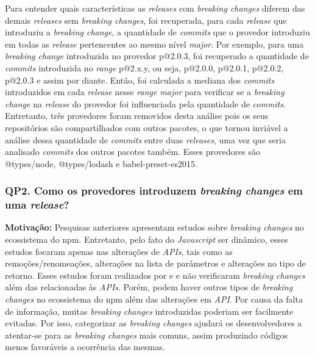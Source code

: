 Para entender quais características as \textit{releases} com \textit{breaking changes} diferem das demais \textit{releases} sem \textit{breaking changes}, foi recuperada, para cada \textit{release} que introduziu a \textit{breaking change}, a quantidade de \textit{commits} que o provedor introduziu em todas as \textit{release} pertencentes ao mesmo nível \textit{major}. Por exemplo, para uma \textit{breaking change} introduzida no provedor \textsf{p@2.0.3}, foi recuperado a quantidade de \textit{commits} introduzida no \textit{range}  \textsf{p@2.x.y}, ou seja, \textsf{p@2.0.0}, \textsf{p@2.0.1}, \textsf{p@2.0.2}, \textsf{p@2.0.3} e assim por diante. Então, foi calculada a mediana dos \textit{commits} introduzidos em cada \textit{release} nesse \textit{range major} para verificar se a \textit{breaking change} na \textit{release} do provedor foi influenciada pela quantidade de \textit{commits}. Entretanto, três provedores foram removidos desta análise pois os seus repositórios são compartilhados com outros pacotes, o que tornou inviável a análise dessa quantidade de \textit{commits} entre duas \textit{releases}, uma vez que seria analisado \textit{commits} dos outros pacotes também. Esses provedores são \textsf{@types/node}, \textsf{@types/lodash} e \textsf{babel-preset-es2015}.


\subsubsection{\large QP2. Como os provedores introduzem \textit{breaking changes} em uma \textit{release}?}
\label{sec:qp2}

\textbf{Motivação:}
Pesquisas anteriores apresentam estudos sobre \textit{breaking changes} no ecossistema do \textsf{npm}. Entretanto, pelo fato do \textit{Javascript} ser dinâmico, esses estudos focaram apenas nas alterações de \textit{APIs}, tais como as remoções/renomeações, alterações na lista de parâmetros e alterações no tipo de retorno. Esses estudos foram realizados por   e  e não verificaram \textit{breaking changes} além das relacionadas às \textit{APIs}. Porém, podem haver outros tipos de \textit{breaking changes} no ecossistema do \textsf{npm} além das alterações em \textit{API}. Por causa da falta de informação, muitas \textit{breaking changes} introduzidas poderiam ser facilmente evitadas. Por isso, categorizar as \textit{breaking changes} ajudará os desenvolvedores a atentar-se para as \textit{breaking changes} mais comuns, assim produzindo códigos menos favoráveis a ocorrência das mesmas.
\newline

